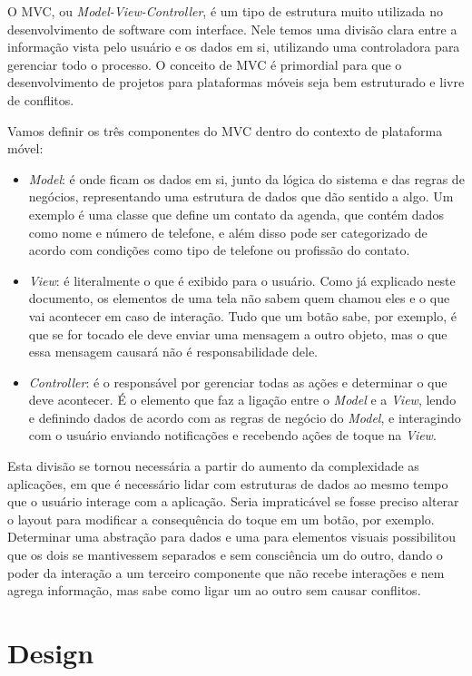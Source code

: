 \documentclass[a4paper,12pt,brazil,oneside]{book}
\begin{document}
O MVC, ou \emph{Model-View-Controller}, é um tipo de estrutura muito utilizada no desenvolvimento de software com interface. Nele temos uma divisão clara entre a informação vista pelo usuário e os dados em si, utilizando uma controladora para gerenciar todo o processo. O conceito de MVC é primordial para que o desenvolvimento de projetos para plataformas móveis seja bem estruturado e livre de conflitos.

Vamos definir os três componentes do MVC dentro do contexto de plataforma móvel:
\begin{itemize}
\item \emph{Model}: é onde ficam os dados em si, junto da lógica do sistema e das regras de negócios, representando uma estrutura de dados que dão sentido a algo. Um exemplo é uma classe que define um contato da agenda, que contém dados como nome e número de telefone, e além disso pode ser categorizado de acordo com condições como tipo de telefone ou profissão do contato.
\item \emph{View}: é literalmente o que é exibido para o usuário. Como já explicado neste documento, os elementos de uma tela não sabem quem chamou eles e o que vai acontecer em caso de interação. Tudo que um botão sabe, por exemplo, é que se for tocado ele deve enviar uma mensagem a outro objeto, mas o que essa mensagem causará não é responsabilidade dele.
\item \emph{Controller}: é o responsável por gerenciar todas as ações e determinar o que deve acontecer. É o elemento que faz a ligação entre o \emph{Model} e a \emph{View}, lendo e definindo dados de acordo com as regras de negócio do \emph{Model}, e interagindo com o usuário enviando notificações e recebendo ações de toque na \emph{View}.
\end{itemize}

Esta divisão se tornou necessária a partir do aumento da complexidade as aplicações, em que é necessário lidar com estruturas de dados ao mesmo tempo que o usuário interage com a aplicação. Seria impraticável se fosse preciso alterar o layout para modificar a consequência do toque em um botão, por exemplo. Determinar uma abstração para dados e uma para elementos visuais possibilitou que os dois se mantivessem separados e sem consciência um do outro, dando o poder da interação a um terceiro componente que não recebe interações e nem agrega informação, mas sabe como ligar um ao outro sem causar conflitos.

\chapter{Design}
\end{document}
